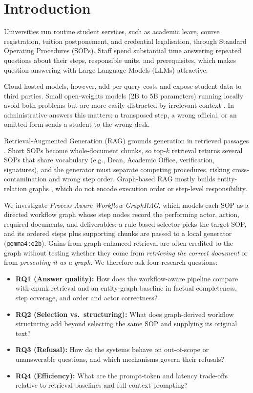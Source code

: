 \documentclass[a4paper,fleqn]{cas-sc}
\begin{document}
\section{Introduction}
\label{sec:intro}

Universities run routine student services, such as academic leave, course registration, tuition postponement, and credential legalisation, through Standard Operating Procedures (SOPs). Staff spend substantial time answering repeated questions about their steps, responsible units, and prerequisites, which makes question answering with Large Language Models (LLMs) attractive.

Cloud-hosted models, however, add per-query costs and expose student data to third parties. Small open-weights models (2B to 5B parameters) running locally avoid both problems but are more easily distracted by irrelevant context \cite{liu2024lost}. In administrative answers this matters: a transposed step, a wrong official, or an omitted form sends a student to the wrong desk.

Retrieval-Augmented Generation (RAG) grounds generation in retrieved passages \cite{lewis2020rag,gao2023ragsurvey}. Short SOPs become whole-document chunks, so top-$k$ retrieval returns several SOPs that share vocabulary (e.g., Dean, Academic Office, verification, signatures), and the generator must separate competing procedures, risking cross-contamination and wrong step order. Graph-based RAG \cite{peng2024graphragsurvey,pan2024unifying} mostly builds entity-relation graphs \cite{edge2024graphrag,guo2024lightrag,gutierrez2024hipporag}, which do not encode execution order or step-level responsibility.

We investigate \emph{Process-Aware Workflow GraphRAG}, which models each SOP as a directed workflow graph \cite{dumas2018fundamentals} whose step nodes record the performing actor, action, required documents, and deliverables; a rule-based selector picks the target SOP, and its ordered steps plus supporting chunks are passed to a local generator (\texttt{gemma4:e2b}). Gains from graph-enhanced retrieval are often credited to the graph without testing whether they come from \emph{retrieving the correct document} or from \emph{presenting it as a graph}. We therefore ask four research questions:
\begin{itemize}[leftmargin=*]
\item \textbf{RQ1 (Answer quality):} How does the workflow-aware pipeline compare with chunk retrieval and an entity-graph baseline in factual completeness, step coverage, and order and actor correctness?
\item \textbf{RQ2 (Selection vs.\ structuring):} What does graph-derived workflow structuring add beyond selecting the same SOP and supplying its original text?
\item \textbf{RQ3 (Refusal):} How do the systems behave on out-of-scope or unanswerable questions, and which mechanisms govern their refusals?
\item \textbf{RQ4 (Efficiency):} What are the prompt-token and latency trade-offs relative to retrieval baselines and full-context prompting?
\end{itemize}
\end{document}
